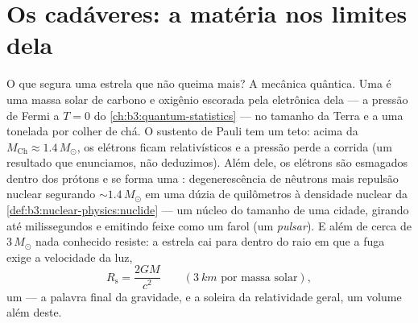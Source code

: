 \section{Os cadáveres: a matéria nos limites dela}

\begin{proposition}\label{prop:b3:astrophysics:compact}
O que segura uma estrela que não queima mais? A mecânica quântica. Uma
\emph{} é uma massa solar de carbono e oxigênio escorada
pela \emph{} eletrônica dela --- a pressão de
Fermi a $T = 0$ do \cref{ch:b3:quantum-statistics} --- no tamanho
da Terra e a uma tonelada por colher de chá. O sustento de Pauli tem um
teto: acima da \emph{} $M_{\text{Ch}}
\approx 1.4\,M_\odot$, os elétrons ficam relativísticos e a
pressão perde a corrida (um resultado que enunciamos, não deduzimos). Além
dele, os elétrons são esmagados dentro dos prótons e se forma uma
\emph{}: degenerescência de nêutrons mais repulsão
nuclear segurando $\sim1.4\,M_\odot$ em uma dúzia de quilômetros à
densidade nuclear da \cref{def:b3:nuclear-physics:nuclide} --- um
núcleo do tamanho de uma cidade, girando até milissegundos e emitindo
feixe como um farol (um \emph{pulsar}). E além de cerca de $3\,M_\odot$
nada conhecido resiste: a estrela cai para dentro do raio em que a
fuga exige a velocidade da luz,
\[
R_{\text{s}} = \frac{2GM}{c^2}
\qquad (\qty{3}{km}\text{ por massa solar}) ,
\]
um \emph{} --- a palavra final da gravidade, e a soleira da
relatividade geral, um volume além deste.
\end{proposition}
\admitted

